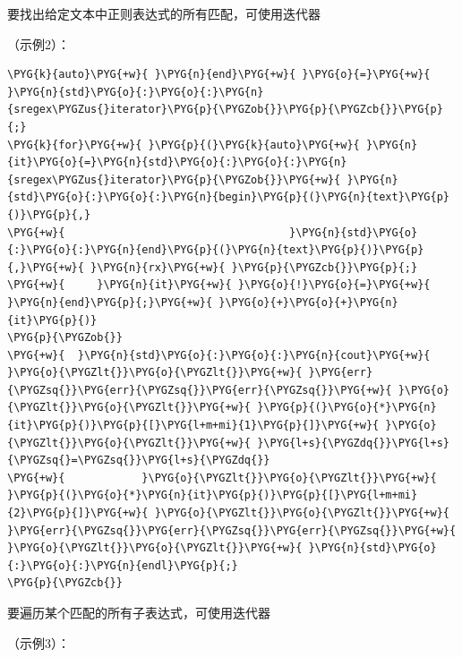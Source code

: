 
要找出给定文本中正则表达式的所有匹配，可使用迭代器



（示例2）：



\begin{codeblockbg}
\begin{Verbatim}[commandchars=\\\{\},breaklines=true,breakanywhere=true,fontsize=\codefont,xleftmargin=17bp]
\PYG{k}{auto}\PYG{+w}{ }\PYG{n}{end}\PYG{+w}{ }\PYG{o}{=}\PYG{+w}{ }\PYG{n}{std}\PYG{o}{:}\PYG{o}{:}\PYG{n}{sregex\PYGZus{}iterator}\PYG{p}{\PYGZob{}}\PYG{p}{\PYGZcb{}}\PYG{p}{;}
\PYG{k}{for}\PYG{+w}{ }\PYG{p}{(}\PYG{k}{auto}\PYG{+w}{ }\PYG{n}{it}\PYG{o}{=}\PYG{n}{std}\PYG{o}{:}\PYG{o}{:}\PYG{n}{sregex\PYGZus{}iterator}\PYG{p}{\PYGZob{}}\PYG{+w}{ }\PYG{n}{std}\PYG{o}{:}\PYG{o}{:}\PYG{n}{begin}\PYG{p}{(}\PYG{n}{text}\PYG{p}{)}\PYG{p}{,}
\PYG{+w}{                                   }\PYG{n}{std}\PYG{o}{:}\PYG{o}{:}\PYG{n}{end}\PYG{p}{(}\PYG{n}{text}\PYG{p}{)}\PYG{p}{,}\PYG{+w}{ }\PYG{n}{rx}\PYG{+w}{ }\PYG{p}{\PYGZcb{}}\PYG{p}{;}
\PYG{+w}{     }\PYG{n}{it}\PYG{+w}{ }\PYG{o}{!}\PYG{o}{=}\PYG{+w}{ }\PYG{n}{end}\PYG{p}{;}\PYG{+w}{ }\PYG{o}{+}\PYG{o}{+}\PYG{n}{it}\PYG{p}{)}
\PYG{p}{\PYGZob{}}
\PYG{+w}{  }\PYG{n}{std}\PYG{o}{:}\PYG{o}{:}\PYG{n}{cout}\PYG{+w}{ }\PYG{o}{\PYGZlt{}}\PYG{o}{\PYGZlt{}}\PYG{+w}{ }\PYG{err}{\PYGZsq{}}\PYG{err}{\PYGZsq{}}\PYG{err}{\PYGZsq{}}\PYG{+w}{ }\PYG{o}{\PYGZlt{}}\PYG{o}{\PYGZlt{}}\PYG{+w}{ }\PYG{p}{(}\PYG{o}{*}\PYG{n}{it}\PYG{p}{)}\PYG{p}{[}\PYG{l+m+mi}{1}\PYG{p}{]}\PYG{+w}{ }\PYG{o}{\PYGZlt{}}\PYG{o}{\PYGZlt{}}\PYG{+w}{ }\PYG{l+s}{\PYGZdq{}}\PYG{l+s}{\PYGZsq{}=\PYGZsq{}}\PYG{l+s}{\PYGZdq{}}
\PYG{+w}{            }\PYG{o}{\PYGZlt{}}\PYG{o}{\PYGZlt{}}\PYG{+w}{ }\PYG{p}{(}\PYG{o}{*}\PYG{n}{it}\PYG{p}{)}\PYG{p}{[}\PYG{l+m+mi}{2}\PYG{p}{]}\PYG{+w}{ }\PYG{o}{\PYGZlt{}}\PYG{o}{\PYGZlt{}}\PYG{+w}{ }\PYG{err}{\PYGZsq{}}\PYG{err}{\PYGZsq{}}\PYG{err}{\PYGZsq{}}\PYG{+w}{ }\PYG{o}{\PYGZlt{}}\PYG{o}{\PYGZlt{}}\PYG{+w}{ }\PYG{n}{std}\PYG{o}{:}\PYG{o}{:}\PYG{n}{endl}\PYG{p}{;}
\PYG{p}{\PYGZcb{}}
\end{Verbatim}
\end{codeblockbg}



要遍历某个匹配的所有子表达式，可使用迭代器



（示例3）：


